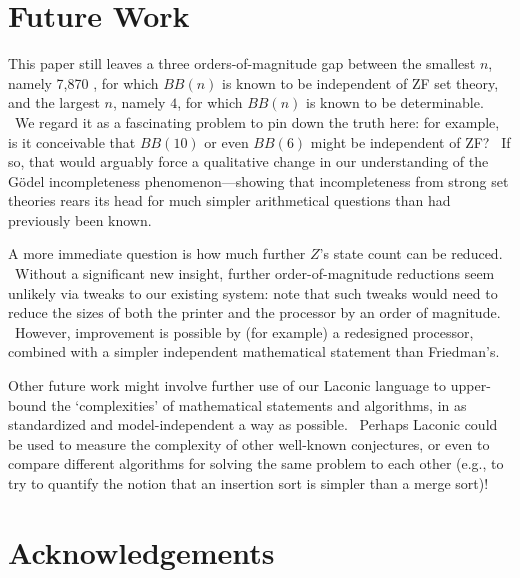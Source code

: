 \documentclass[11pt]{article}
\newcommand{\statenum}{7,870 }
\begin{document}
\section{Future Work}

This paper still leaves a three orders-of-magnitude gap between the smallest $n$, namely \statenum, for which $BB(n)$ is known to be independent of ZF set theory, and the largest $n$, namely $4$, for which $BB(n)$ is known to be determinable. \ We regard it as a fascinating problem to pin down the truth here: for example, is it conceivable that $BB(10)$ or even $BB(6)$ might be independent of ZF? \ If so, that would arguably force a qualitative change in our understanding of the G\"{o}del incompleteness phenomenon---showing that incompleteness from strong set theories rears its head for much simpler arithmetical questions than had previously been known.

A more immediate question is how much further $Z$'s state count can be reduced. \ Without a significant new insight, further order-of-magnitude reductions seem unlikely via tweaks to our existing system: note that such tweaks would need to reduce the sizes of both the printer and the processor by an order of magnitude. \ However, improvement is possible by (for example) a redesigned processor, combined with a simpler independent mathematical statement than Friedman's.

Other future work might involve further use of our Laconic language to upper-bound the `complexities' of mathematical statements and algorithms, in as standardized and model-independent a way as possible. \ Perhaps Laconic could be used to measure the complexity of other well-known conjectures, or even to compare different algorithms for solving the same problem to each other (e.g., to try to quantify the notion that an insertion sort is simpler than a merge sort)!

\section{Acknowledgements}

\end{document}
